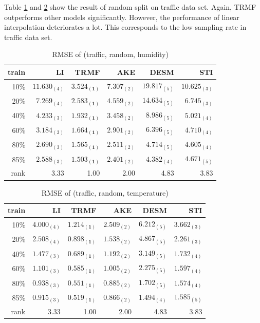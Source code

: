 Table \ref{table:traffic_random_hum} and \ref{table:traffic_random_tem} show the result of random split on traffic data set. Again, TRMF outperforms other models significantly. However, the performance of linear interpolation deteriorates a lot. This corresponds to the low sampling rate in traffic data set. 

\begin{table} [htbp]
\centering
\caption{RMSE of (traffic, random, humidity)}
\label{table:traffic_random_hum}
\begin{tabular}{ r | r r r r r}
	train	&LI	&TRMF	&AKE	&DESM	&STI\\ \hline
	10\% & $ 11.630_{(4)} $ & $ \mathbf{ 3.524_{(1)} } $ & $ 7.307_{(2)} $ & $ 19.817_{(5)} $ & $ 10.625_{(3)} $ \\
	20\% & $ 7.269_{(4)} $ & $ \mathbf{ 2.583_{(1)} } $ & $ 4.559_{(2)} $ & $ 14.634_{(5)} $ & $ 6.745_{(3)} $ \\
	40\% & $ 4.233_{(3)} $ & $ \mathbf{ 1.932_{(1)} } $ & $ 3.458_{(2)} $ & $ 8.986_{(5)} $ & $ 5.021_{(4)} $ \\
	60\% & $ 3.184_{(3)} $ & $ \mathbf{ 1.664_{(1)} } $ & $ 2.901_{(2)} $ & $ 6.396_{(5)} $ & $ 4.710_{(4)} $ \\
	80\% & $ 2.690_{(3)} $ & $ \mathbf{ 1.565_{(1)} } $ & $ 2.511_{(2)} $ & $ 4.714_{(5)} $ & $ 4.605_{(4)} $ \\
	85\% & $ 2.588_{(3)} $ & $ \mathbf{ 1.503_{(1)} } $ & $ 2.401_{(2)} $ & $ 4.382_{(4)} $ & $ 4.671_{(5)} $ \\ \hline
	rank &3.33 &1.00 &2.00 &4.83 &3.83 \\
\end{tabular}
\end{table}

\begin{table} [htbp]
\centering
\caption{RMSE of (traffic, random, temperature)}
\label{table:traffic_random_tem}
\begin{tabular}{ r | r r r r r}
	train	&LI	&TRMF	&AKE	&DESM	&STI\\ \hline
	10\% & $ 4.000_{(4)} $ & $ \mathbf{ 1.214_{(1)} } $ & $ 2.509_{(2)} $ & $ 6.212_{(5)} $ & $ 3.662_{(3)} $ \\
	20\% & $ 2.508_{(4)} $ & $ \mathbf{ 0.898_{(1)} } $ & $ 1.538_{(2)} $ & $ 4.867_{(5)} $ & $ 2.261_{(3)} $ \\
	40\% & $ 1.477_{(3)} $ & $ \mathbf{ 0.689_{(1)} } $ & $ 1.192_{(2)} $ & $ 3.149_{(5)} $ & $ 1.732_{(4)} $ \\
	60\% & $ 1.101_{(3)} $ & $ \mathbf{ 0.585_{(1)} } $ & $ 1.005_{(2)} $ & $ 2.275_{(5)} $ & $ 1.597_{(4)} $ \\
	80\% & $ 0.938_{(3)} $ & $ \mathbf{ 0.551_{(1)} } $ & $ 0.885_{(2)} $ & $ 1.702_{(5)} $ & $ 1.574_{(4)} $ \\
	85\% & $ 0.915_{(3)} $ & $ \mathbf{ 0.519_{(1)} } $ & $ 0.866_{(2)} $ & $ 1.494_{(4)} $ & $ 1.585_{(5)} $ \\ \hline
	rank &3.33 &1.00 &2.00 &4.83 &3.83 \\
\end{tabular}
\end{table}

